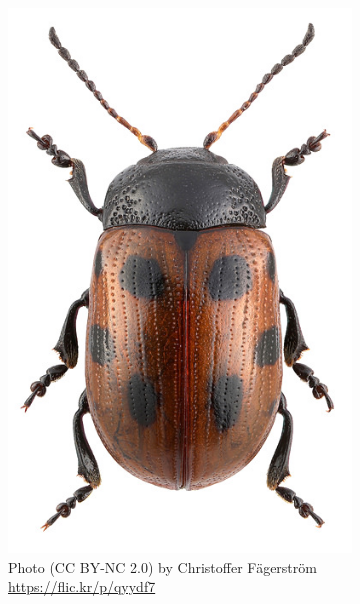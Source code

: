 \documentclass[letterpaper, 11pt]{article}
\begin{document}
\begin{figure}[ht!]
\begin{subfigure}[ht!]{0.22\textwidth}
    \includegraphics[width=\textwidth]{Chrysomelid2}
  \caption{Photo (CC BY-NC 2.0) by Christoffer F\"{a}gerstr\"{o}m  \url{https://flic.kr/p/qyydf7}}
  \label{fig:chrysomelid2}
\end{subfigure}
    ~
\begin{subfigure}[ht!]{0.23\textwidth}

\end{subfigure}
\end{figure}
\end{document}
